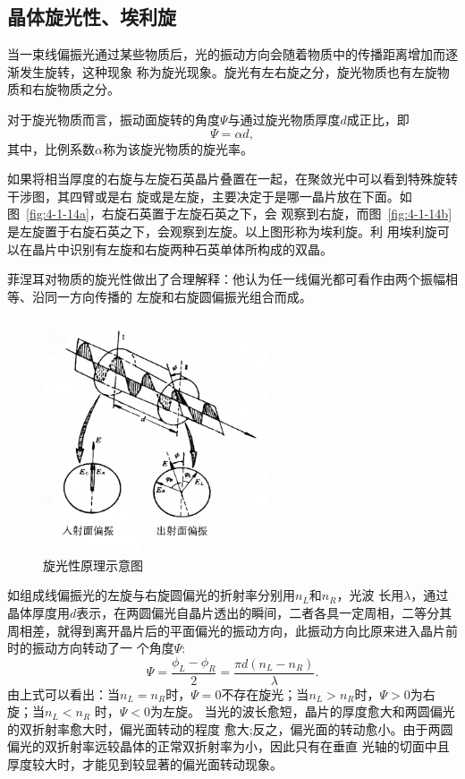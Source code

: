 \documentclass[11pt,a4paper]{article}
\begin{document}
\begin{spacing}{1.3}
\begin{CJK*}{UTF8}{gbsn}
\subsection{晶体旋光性、埃利旋}
当一束线偏振光通过某些物质后，光的振动方向会随着物质中的传播距离增加而逐渐发生旋转，这种现象
称为旋光现象。旋光有左右旋之分，旋光物质也有左旋物质和右旋物质之分。\par
对于旋光物质而言，振动面旋转的角度$\Psi$与通过旋光物质厚度$d$成正比，即
\begin{equation}
\Psi=\alpha d,
\end{equation}
其中，比例系数$\alpha$称为该旋光物质的旋光率。\par
如果将相当厚度的右旋与左旋石英晶片叠置在一起，在聚敛光中可以看到特殊旋转干涉图，其四臂或是右
旋或是左旋，主要决定于是哪一晶片放在下面。如图~\ref{fig:4-1-14a}，右旋石英置于左旋石英之下，会
观察到右旋，而图~\ref{fig:4-1-14b}是左旋置于右旋石英之下，会观察到左旋。以上图形称为埃利旋。利
用埃利旋可以在晶片中识别有左旋和右旋两种石英单体所构成的双晶。\par 
菲涅耳对物质的旋光性做出了合理解释：他认为任一线偏光都可看作由两个振幅相等、沿同一方向传播的
左旋和右旋圆偏振光组合而成。
\begin{figure}[h!]
\centering
\includegraphics[width=0.6\textwidth]{fig4-1-15}
\caption{旋光性原理示意图}
\label{fig:4-1-15}
\end{figure}
如组成线偏振光的左旋与右旋圆偏光的折射率分别用$n_L$和$n_R$，光波
长用$\lambda$，通过晶体厚度用$d$表示，在两圆偏光自晶片透出的瞬间，二者各具一定周相，二等分其
周相差，就得到离开晶片后的平面偏光的振动方向，此振动方向比原来进入晶片前时的振动方向转动了一
个角度$\Psi$:
\begin{equation}
\Psi=\frac{\phi_L-\phi_R}{2}=\frac{\pi d(n_L-n_R)}{\lambda}.
\end{equation}
由上式可以看出：当$n_L=n_R$时，$\Psi=0$不存在旋光；当$n_L>n_R$时，$\Psi>0$为右旋；当$n_L<n_R$
时，$\Psi<0$为左旋。
当光的波长愈短，晶片的厚度愈大和两圆偏光的双折射率愈大时，偏光面转动的程度
愈大;反之，偏光面的转动愈小。由于两圆偏光的双折射率远较晶体的正常双折射率为小，因此只有在垂直
光轴的切面中且厚度较大时，才能见到较显著的偏光面转动现象。


\end{CJK*}
\end{spacing}
\end{document}
